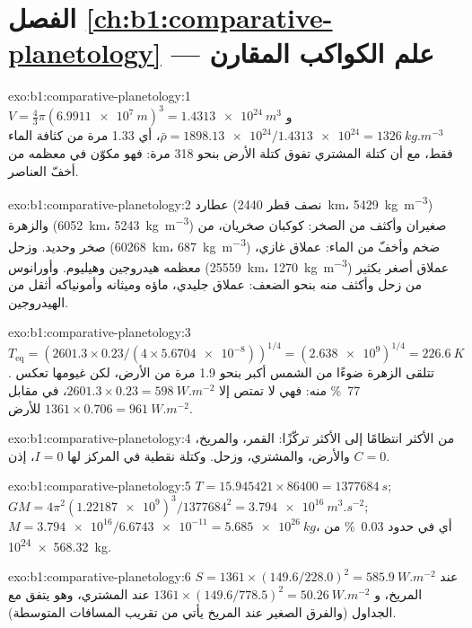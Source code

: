 \section*{الفصل \ref{ch:b1:comparative-planetology} --- علم الكواكب المقارن}

\begin{solution}{exo:b1:comparative-planetology:1}
$V = \tfrac43\pi(\qty{6.9911e7}{m})^3 = \qty{1.4313e24}{m^3}$ و
$\bar\rho = \num{1898.13e24}/\num{1.4313e24} = \qty{1326}{kg.m^{-3}}$، أي 1.33 مرة من كثافة الماء فقط، مع أن كتلة المشتري تفوق كتلة الأرض بنحو 318 مرة: فهو مكوّن في معظمه من أخفّ العناصر.
\end{solution}

\begin{solution}{exo:b1:comparative-planetology:2}
عطارد (نصف قطر \qty{2440}{km}، \qty{5429}{kg.m^{-3}}) والزهرة (\qty{6052}{km}، \qty{5243}{kg.m^{-3}}) صغيران وأكثف من الصخر: كوكبان صخريان، من صخر وحديد. وزحل (\qty{60268}{km}، \qty{687}{kg.m^{-3}}) ضخم وأخفّ من الماء: عملاق غازي، معظمه هيدروجين وهيليوم. وأورانوس (\qty{25559}{km}، \qty{1270}{kg.m^{-3}}) عملاق أصغر بكثير من زحل وأكثف منه بنحو الضعف: عملاق جليدي، ماؤه وميثانه وأمونياكه أثقل من الهيدروجين.
\end{solution}

\begin{solution}{exo:b1:comparative-planetology:3}
$T_\mathrm{eq} = (2601.3\times0.23/(4\times\num{5.6704e-8}))^{1/4} =
(\num{2.638e9})^{1/4} = \qty{226.6}{K}$. تتلقى الزهرة ضوءًا من الشمس أكبر بنحو 1.9 مرة من الأرض، لكن غيومها تعكس \qty{77}{\percent} منه: فهي لا تمتص إلا $2601.3\times0.23 = \qty{598}{W.m^{-2}}$، في مقابل $1361\times0.706 = \qty{961}{W.m^{-2}}$ للأرض.
\end{solution}

\begin{solution}{exo:b1:comparative-planetology:4}
من الأكثر انتظامًا إلى الأكثر تركّزًا: القمر، والمريخ، والأرض، والمشتري، وزحل. وكتلة نقطية في المركز لها $I = 0$، إذن $C = 0$.
\end{solution}

\begin{solution}{exo:b1:comparative-planetology:5}
$T = 15.945421\times86400 = \qty{1377684}{s}$;
$GM = 4\pi^2(\num{1.22187e9})^3/\num{1377684}^2 = \qty{3.794e16}{m^3.s^{-2}}$;
$M = \num{3.794e16}/\num{6.6743e-11} = \qty{5.685e26}{kg}$، أي في حدود
\qty{0.03}{\percent} من \qty{568.32e24}{kg}.
\end{solution}

\begin{solution}{exo:b1:comparative-planetology:6}
$S = 1361\times(149.6/228.0)^2 = \qty{585.9}{W.m^{-2}}$ عند المريخ، و
$1361\times(149.6/778.5)^2 = \qty{50.26}{W.m^{-2}}$ عند المشتري، وهو يتفق مع الجداول (والفرق الصغير عند المريخ يأتي من تقريب المسافات المتوسطة).
\end{solution}

